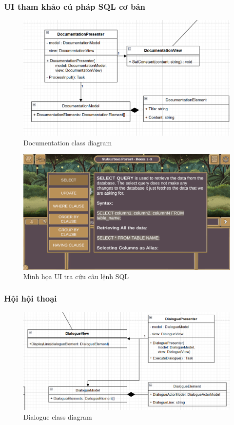 \subsubsection{UI tham khảo cú pháp SQL cơ bản}
\begin{figure}[H]
	\centering
	\includegraphics[width=13cm]{Images/DocumentationView.png}
	\vspace{0.5cm}
	\caption{Documentation class diagram}
\end{figure}

\begin{figure}[H]
	\centering
	\includegraphics[width=13cm]{Images/DocumentationUI.png}
	\vspace{0.5cm}
	\caption{Minh họa UI tra cứu câu lệnh SQL}
\end{figure}

\subsubsection{Hội hội thoại}
\begin{figure}[H]
	\centering
	\includegraphics[width=13cm]{Images/DialogueView.png}
	\vspace{0.5cm}
	\caption{Dialogue class diagram}
\end{figure}

